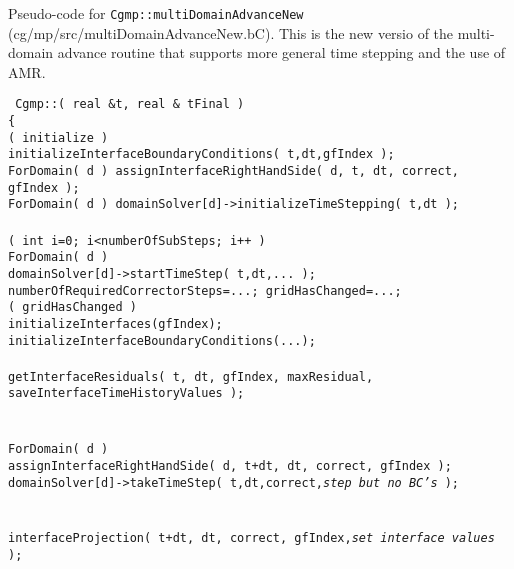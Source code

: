 \documentclass[11pt]{article}
\newcommand{\green}{\color{green}}
\begin{document}
Pseudo-code for {\tt Cgmp::multiDomainAdvanceNew} (cg/mp/src/multiDomainAdvanceNew.bC). This is 
the new versio of the multi-domain advance routine that supports more general time stepping and
the use of AMR.


\begin{flushleft}\tt\small
Cgmp::( real \&t, real \& tFinal ) \\
\{  \\
\ia  \IF( initialize ) \\
\ib    initializeInterfaceBoundaryConditions( t,dt,gfIndex );\\
\ib    ForDomain( d ) assignInterfaceRightHandSide( d, t, dt, correct, gfIndex );\\
\ib    ForDomain( d ) domainSolver[d]->initializeTimeStepping( t,dt );\\
\ia  {}\\
\ia  \FOR( int i=0; i<numberOfSubSteps; i++ )\\
\ib    ForDomain( d )\\
\ic      domainSolver[d]->startTimeStep( t,dt,... );\\
\ic      numberOfRequiredCorrectorSteps=...; gridHasChanged=...; \\ 
\ib    \IF( gridHasChanged ) \\
\ic      initializeInterfaces(gfIndex); initializeInterfaceBoundaryConditions(...); \\
\ib    {} \\
\ib    getInterfaceResiduals( t, dt, gfIndex, maxResidual, saveInterfaceTimeHistoryValues ); \\
\ib \\
\ic       {} \\
\ic       ForDomain( d )  \\
\id         assignInterfaceRightHandSide( d, t+dt, dt, correct, gfIndex ); \\
\id         domainSolver[d]->takeTimeStep( t,dt,correct,{\em\green step but no BC's} );  \\
\ic \\
\ic       {} \\
\ic       interfaceProjection( t+dt, dt, correct, gfIndex,{\em\green set interface values} ); \\

\end{flushleft}
\end{document}
